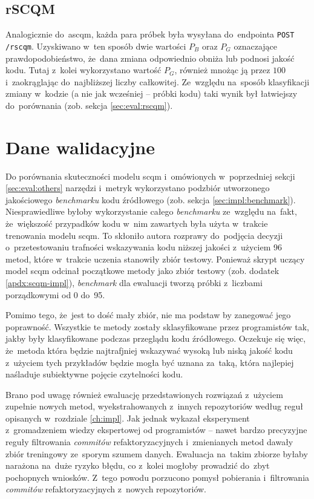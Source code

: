 \documentclass[twoside]{praca}
\begin{document}
\subsection{rSCQM}
Analogicznie do~\gls{ascqm}, każda para próbek była wysyłana do~endpointa \texttt{POST /rscqm}. Uzyskiwano w~ten sposób dwie wartości $P_B$ oraz $P_G$ oznaczające prawdopodobieństwo, że~dana zmiana odpowiednio obniża lub podnosi jakość kodu. Tutaj z~kolei wykorzystano wartość $P_G$, również mnożąc ją przez $100$ i~zaokrąglając do~najbliższej liczby całkowitej. Ze~względu na~sposób klasyfikacji zmiany w~kodzie (a nie jak wcześniej -- próbki kodu) taki wynik był łatwiejszy do~porównania (zob. sekcja \ref{sec:eval:rscqm}).


\section{Dane walidacyjne}
\label{sec:eval:benchmark}
Do porównania skuteczności modelu \gls{scqm} i~omówionych w~poprzedniej sekcji \ref{sec:eval:others} narzędzi i~metryk wykorzystano podzbiór utworzonego jakościowego \textit{benchmarku} kodu źródłowego (zob. sekcja \ref{sec:impl:benchmark}). Niesprawiedliwe byłoby wykorzystanie całego \textit{benchmarku} ze~względu na~fakt, że~większość przypadków kodu w~nim zawartych była użyta w~trakcie trenowania modelu \gls{scqm}. To skłoniło autora rozprawy do~podjęcia decyzji o~przetestowaniu trafności wskazywania kodu niższej jakości z~użyciem 96 metod, które w~trakcie uczenia stanowiły zbiór testowy. Ponieważ skrypt uczący model \gls{scqm} odcinał początkowe metody jako zbiór testowy (zob. dodatek \ref{apdx:scqm-impl}), \textit{benchmark} dla ewaluacji tworzą próbki z~liczbami porządkowymi od 0 do~95.

Pomimo tego, że~jest to dość mały zbiór, nie ma podstaw by zanegować jego poprawność. Wszystkie te metody zostały sklasyfikowane przez programistów tak, jakby były klasyfikowane podczas przeglądu kodu źródłowego. Oczekuje się więc, że~metoda która będzie najtrafjniej wskazywać wysoką lub niską jakość kodu z~użyciem tych przykładów będzie mogła być uznana za~taką, która najlepiej naśladuje subiektywne pojęcie czytelności kodu.

Brano pod uwagę również ewaluację przedstawionych rozwiązań z~użyciem zupełnie nowych metod, wyekstrahowanych z~innych repozytoriów według reguł opisanych w~rozdziale \ref{ch:impl}. Jak jednak wykazał eksperyment z~gromadzeniem wiedzy ekspertowej od programistów -- nawet bardzo precyzyjne reguły filtrowania \textit{commitów} refaktoryzacyjnych i~zmienianych metod dawały zbiór treningowy ze~sporym szumem danych. Ewaluacja na~takim zbiorze byłaby narażona na~duże ryzyko błędu, co z~kolei mogłoby prowadzić do~zbyt pochopnych wniosków. Z~tego powodu porzucono pomysł pobierania i~filtrowania \textit{commitów} refaktoryzacyjnych z~nowych repozytoriów.
\end{document}
